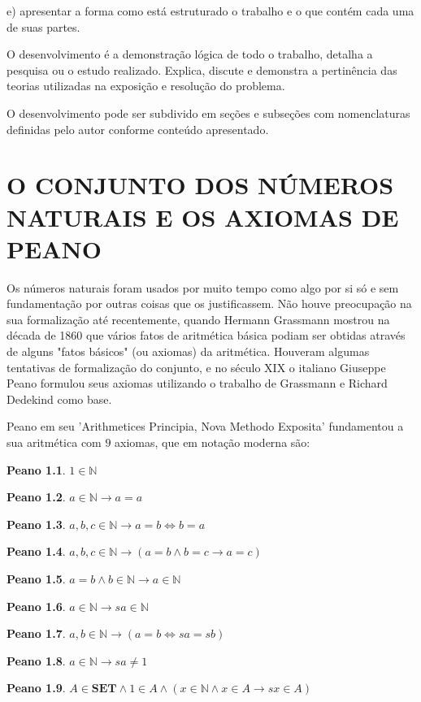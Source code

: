 \documentclass[
	12pt,				%
	oneside,			%
	a4paper,			%
	english,			%
	french,				%
	spanish,			%
	brazil,				%
	]{abntex2}
\newcommand{\N}{\ensuremath {\mathbb{N}} }
\theoremstyle{plain}
\newtheorem{peano}{Peano}
\theoremstyle{definition}
\begin{document}
    e) apresentar a forma como está estruturado o trabalho e o que contém cada uma de suas partes.
    
O desenvolvimento é a demonstração lógica de todo o trabalho, detalha a pesquisa ou o estudo realizado. Explica, discute e demonstra a pertinência das teorias utilizadas na exposição e resolução do problema. 

O desenvolvimento pode ser subdivido em seções e subseções com nomenclaturas definidas pelo autor conforme conteúdo apresentado. 

\chapter{O CONJUNTO DOS NÚMEROS NATURAIS E OS AXIOMAS DE PEANO}
Os números naturais foram usados por muito tempo como algo por si só e sem fundamentação por outras coisas que os justificassem. Não houve preocupação na sua formalização até recentemente, quando Hermann Grassmann mostrou na década de 1860 que vários fatos de aritmética básica podiam ser obtidas através de alguns "fatos básicos" (ou axiomas) da aritmética.
Houveram algumas tentativas de formalização do conjunto, e no século XIX o italiano Giuseppe Peano formulou seus axiomas utilizando o trabalho de Grassmann e Richard Dedekind como base.

Peano em seu 'Arithmetices Principia, Nova Methodo Exposita' fundamentou a sua aritmética com $9$ axiomas, que em notação moderna são:
\begin{peano}
    $1 \in \N$
\end{peano}
\begin{peano}
    $a \in \N \rightarrow a = a$
\end{peano}
\begin{peano}
    $a,b,c \in \N \rightarrow a = b \iff b = a$
\end{peano}
\begin{peano}
    $a,b,c \in \N \rightarrow (a = b \land b = c \rightarrow a = c) $
\end{peano}
\begin{peano}
    $a = b \land b \in \N \rightarrow a \in \N$
\end{peano}
\begin{peano}
    $a \in \N \rightarrow sa \in \N$
\end{peano}
\begin{peano}
    $a,b \in \N \rightarrow (a = b \iff sa = sb)$
\end{peano}
\begin{peano}
    $a \in \N \rightarrow sa \neq 1$
\end{peano}
\begin{peano}
    $A \in \textbf{SET} \land 1 \in A \land (x \in \N \land x \in A \rightarrow sx \in A)$
\end{peano}
\end{document}
